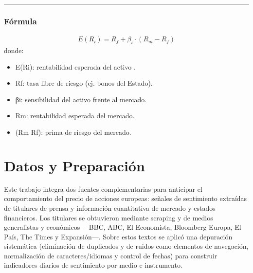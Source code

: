 \documentclass[letterpaper,10pt,spanish]{sphinxmanual}
\begin{document}
\bigskip\hrule\bigskip



\subsection{Fórmula}
\label{\detokenize{MarcoTeorico:formula}}\begin{equation*}
\begin{split}E(R_i) = R_f + \beta_i \cdot (R_m - R_f)\end{split}
\end{equation*}
\sphinxAtStartPar
donde:
\begin{itemize}
\item {} 
\sphinxAtStartPar
E(Ri): rentabilidad esperada del activo .

\item {} 
\sphinxAtStartPar
Rf: tasa libre de riesgo (ej. bonos del Estado).

\item {} 
\sphinxAtStartPar
βi: sensibilidad del activo frente al mercado.

\item {} 
\sphinxAtStartPar
Rm: rentabilidad esperada del mercado.

\item {} 
\sphinxAtStartPar
(Rm \sphinxhyphen{} Rf): prima de riesgo del mercado.

\end{itemize}

\sphinxstepscope


\chapter{Datos y Preparación}
\label{\detokenize{DatosPreparacion:datos-y-preparacion}}\label{\detokenize{DatosPreparacion::doc}}
\sphinxAtStartPar
Este trabajo integra dos fuentes complementarias para anticipar el comportamiento del precio de acciones europeas: señales de sentimiento extraídas de titulares de prensa y información cuantitativa de mercado y estados financieros. Los titulares se obtuvieron mediante scraping y de medios generalistas y económicos —BBC, ABC, El Economista, Bloomberg Europa, El País, The Times y Expansión—. Sobre estos textos se aplicó una depuración sistemática (eliminación de duplicados y de ruidos como elementos de navegación, normalización de caracteres/idiomas y control de fechas) para construir indicadores diarios de sentimiento por medio e instrumento.
\end{document}
